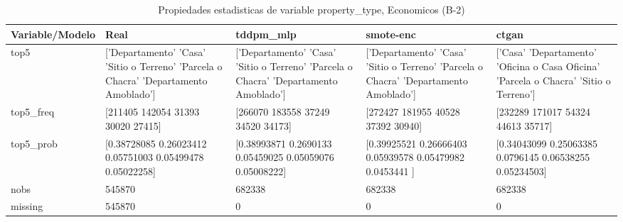 \begin{table}[H]
\centering
\fontsize{8}{14}\selectfont
\caption{Propiedades  estadisticas de variable property\_type, Economicos (B-2)}
\label{table-stats-economicos-b-2-property_type}
\begin{tabular}{|l|m{10em}|m{10em}|m{10em}|m{10em}|}
\hline
 \rowcolor[gray]{0.8}
Variable/Modelo & Real & tddpm\_mlp & smote-enc & ctgan \\
\hline top5 & ['Departamento' 'Casa' 'Sitio o Terreno' 'Parcela o Chacra'
 'Departamento Amoblado'] & ['Departamento' 'Casa' 'Sitio o Terreno' 'Parcela o Chacra'
 'Departamento Amoblado'] & ['Departamento' 'Casa' 'Sitio o Terreno' 'Parcela o Chacra'
 'Departamento Amoblado'] & ['Casa' 'Departamento' 'Oficina o Casa Oficina' 'Parcela o Chacra'
 'Sitio o Terreno'] \\
\hline top5\_freq & [211405 142054  31393  30020  27415] & [266070 183558  37249  34520  34173] & [272427 181955  40528  37392  30940] & [232289 171017  54324  44613  35717] \\
\hline top5\_prob & [0.38728085 0.26023412 0.05751003 0.05499478 0.05022258] & [0.38993871 0.2690133  0.05459025 0.05059076 0.05008222] & [0.39925521 0.26666403 0.05939578 0.05479982 0.0453441 ] & [0.34043099 0.25063385 0.0796145  0.06538255 0.05234503] \\
\hline nobs & 545870 & 682338 & 682338 & 682338 \\
\hline missing & 545870 & 0 & 0 & 0 \\
\hline
\end{tabular}
\end{table}
